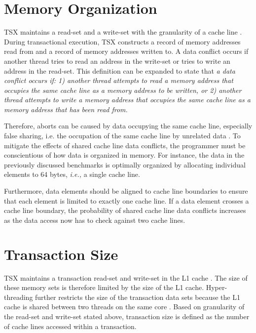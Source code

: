 \documentclass[11pt]{book}
\begin{document}
\section{Memory Organization}

TSX maintains a read-set and a write-set with the granularity of a cache line
\cite{intel_prog_ref}.  During transactional execution, TSX constructs a record of memory
addresses read from and a record of memory addresses written to.  A data conflict occurs
if another thread tries to read an address in the write-set or tries to write an address
in the read-set.  This definition can be expanded to state that \textit{a data conflict
  occurs if: 1) another thread attempts to read a memory address that occupies the same
  cache line as a memory address to be written, or 2) another thread attempts to write a
  memory address that occupies the same cache line as a memory address that has been read
  from.}

Therefore, aborts can be caused by data occupying the same cache line, especially false
sharing, i.e. the occupation of the same cache line by unrelated data
\cite{intel_opt_man}.  To mitigate the effects of shared cache line data conflicts, the
programmer must be conscientious of how data is organized in memory.  For instance, the
data in the previously discussed benchmarks is optimally organized by allocating
individual elements to 64 bytes, \emph{i.e.,} a single cache line.

Furthermore, data elements should be aligned to cache line boundaries to ensure that each
element is limited to exactly one cache line.  If a data element crosses a cache line
boundary, the probability of shared cache line data conflicts increases as the data access
now has to check against two cache lines.

\section{Transaction Size}

TSX maintains a transaction read-set and write-set in the L1 cache \cite{intel_opt_man}.
The size of these memory sets is therefore limited by the size of the L1 cache.
Hyper-threading further restricts the size of the transaction data sets because the L1
cache is shared between two threads on the same core \cite{intel_opt_man}.  Based on
granularity of the read-set and write-set stated above, transaction size is defined as the
number of cache lines accessed within a transaction.
\end{document}
